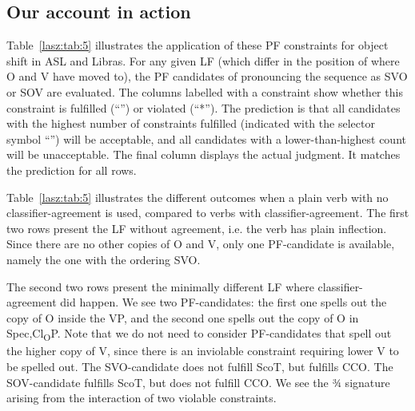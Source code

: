 \documentclass[output=paper,colorlinks,citecolor=brown,
]{langscibook}
\begin{document}
\subsection{Our account in action}
\label{lasz:sec:24}

Table~\ref{lasz:tab:5} illustrates the application of these PF constraints for object
shift in ASL and Libras. For any given LF (which differ in the position
of where O and V have moved to), the PF candidates of pronouncing
the sequence as SVO or SOV are evaluated. The columns labelled with a constraint 
show whether this constraint is fulfilled (“\cmark”) or violated (“*”).
The prediction is that all candidates with the highest number of
constraints fulfilled (indicated with the selector symbol “\HandLeft”) will be
acceptable, and all candidates with a lower-than-highest count will be
unacceptable. The final column displays the actual judgment. It 
matches the prediction for all rows. 

Table~\ref{lasz:tab:5} illustrates the different outcomes when a plain verb
with no classifier-agreement is used, compared to verbs with
classifier-agreement. The first two rows present the LF without
agreement, i.e. the verb has plain inflection. Since there are no other
copies of O and V, only one PF-candidate is available, namely the one
with the ordering SVO.

The second two rows present the minimally different LF where
classifier-agreement did happen. We see two PF-candidates: the first
one spells out the copy of O inside the VP, and the second one spells
out the copy of O in Spec,Cl\textsubscript{O}P. Note that we do not need to consider
PF-candidates that spell out the higher copy of V, since there is an
inviolable constraint requiring lower V to be spelled out. The
SVO-candidate does not fulfill ScoT, but fulfills CCO. The
SOV-candidate fulfills ScoT, but does not fulfill CCO. We see the 3⁄4
signature arising from the interaction of two violable constraints.
\end{document}
